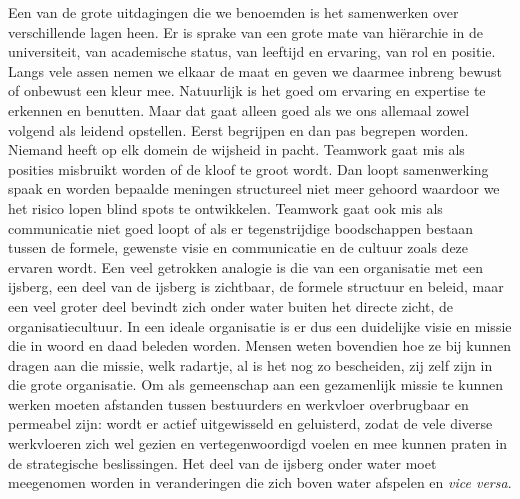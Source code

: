 \documentclass[smallauthor, chapterhaspagenum, nochapterinheader, pagenuminheader,  bigchapnum,medium2, tocpages, garamond, titleinheader]{jote-book}
\begin{document}
	Een van de grote uitdagingen die we benoemden is het samenwerken over verschillende lagen heen. Er is sprake van een grote mate van hiërarchie in de universiteit, van academische status, van leeftijd en ervaring, van rol en positie. Langs vele assen nemen we elkaar de maat en geven we daarmee inbreng bewust of onbewust een kleur mee. Natuurlijk is het goed om ervaring en expertise te erkennen en benutten. Maar dat gaat alleen goed als we ons allemaal zowel volgend als leidend opstellen. Eerst begrijpen en dan pas begrepen worden. Niemand heeft op elk domein de wijsheid in pacht. Teamwork gaat mis als posities misbruikt worden of de kloof te groot wordt. Dan loopt samenwerking spaak en worden bepaalde meningen structureel niet meer gehoord waardoor we het risico lopen blind spots te ontwikkelen. Teamwork gaat ook mis als communicatie niet goed loopt of als er tegenstrijdige boodschappen bestaan tussen de formele, gewenste visie en communicatie en de cultuur zoals deze ervaren wordt. Een veel getrokken analogie is die van een organisatie met een ijsberg, een deel van de ijsberg is zichtbaar, de formele structuur en beleid, maar een veel groter deel bevindt zich onder water buiten het directe zicht, de organisatiecultuur. In een ideale organisatie is er dus een duidelijke visie en missie die in woord en daad beleden worden. Mensen weten bovendien hoe ze bij kunnen dragen aan die missie, welk radartje, al is het nog zo bescheiden, zij zelf zijn in die grote organisatie. Om als gemeenschap aan een gezamenlijk missie te kunnen werken moeten afstanden tussen bestuurders en werkvloer overbrugbaar en permeabel zijn: wordt er actief uitgewisseld en geluisterd, zodat de vele diverse werkvloeren zich wel gezien en vertegenwoordigd voelen en mee kunnen praten in de strategische beslissingen. Het deel van de ijsberg onder water moet meegenomen worden in veranderingen die zich boven water afspelen en \emph{vice versa}.
\end{document}
